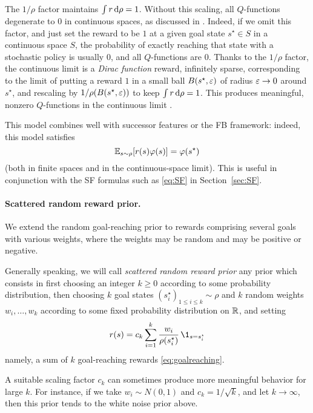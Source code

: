 \documentclass[11pt,a4paper]{article}
\begin{document}
The $1/\rho$ factor maintains $\int r\operatorname{d}\!{} \rho=1$. Without this scaling,
all $Q$-functions degenerate to $0$ in continuous spaces,
as discussed in
\cite{blier2021unbiased}. Indeed, if we omit this factor, and just set the reward to be $1$ at
a given goal state $s^\star\in S$ in a continuous space $S$, the probability of
exactly reaching that state with a stochastic policy is usually $0$, and all
$Q$-functions are $0$. Thanks to the $1/\rho$ factor, the
continuous limit is a \emph{Dirac function} reward, infinitely sparse,
corresponding to the limit of putting a reward $1$ in a small ball
$B(s^\star,\varepsilon)$ of radius $\varepsilon\to 0$ around $s^\star$, and rescaling by
$1/\rho(B(s^\star,\varepsilon))$ to keep $\int r\operatorname{d}\!{} \rho=1$. This produces meaningful,
nonzero $Q$-functions in the continuous limit \cite{blier2021unbiased}.

This model combines well with successor features or the FB framework:
indeed, this model satisfies
\begin{equation}
\mathbb{E}_{s\sim \rho} [r(s)\varphi(s)]=\varphi(s^\star)
\end{equation}
(both in finite spaces and in the continuous-space limit). This is useful
in conjunction with the SF formulas such as \eqref{eq:SF} in Section~\ref{sec:SF}.

\paragraph{Scattered random reward prior.} We extend the random
goal-reaching prior to rewards comprising several goals with various
weights, where the weights may be random and may be positive or negative.

Generally speaking, we will call \emph{scattered random reward prior} any
prior which consists in first choosing an integer $k\geq 0$ according to
some probability distribution, then choosing $k$ goal states
$(s^\star_i)_{1\leq i \leq k}\sim \rho$ and $k$ random weights
$w_i,\ldots,w_k$ according to some fixed probability distribution on
${\mathbb{R}}$, and setting
\begin{equation}
r(s)=c_k \sum_{i=1}^k 
\frac{w_i}{\rho(s^\star_i)} \,\1_{s=s^\star_i}
\end{equation}
namely, a sum of $k$ goal-reaching rewards \eqref{eq:goalreaching}.

A suitable scaling factor $c_k$ can sometimes produce more
meaningful behavior for large $k$. For instance, if we take $w_i\sim N(0,1)$ and
$c_k=1/\sqrt{k}$, and let $k\to \infty$, then this prior tends to the white noise
prior above.
\end{document}
